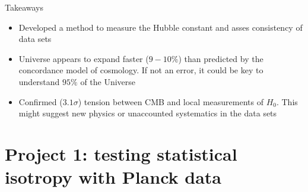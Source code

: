 \documentclass{beamer}
\begin{document}
\begin{frame}{Takeaways}
\begin{itemize}

\item Developed a method to measure the Hubble constant and asses consistency of data sets 
\item Universe appears to expand faster ($9-10\%$) than predicted by the  concordance model of cosmology. If not an error, it could be key to understand $95\%$ of the Universe
\item Confirmed ($3.1\sigma$) tension between CMB and local measurements of $H_0$. This might suggest new physics or unaccounted systematics in the data sets
\end{itemize}
\end{frame}


\section*{Project 1: testing statistical isotropy with Planck data}
\end{document}
